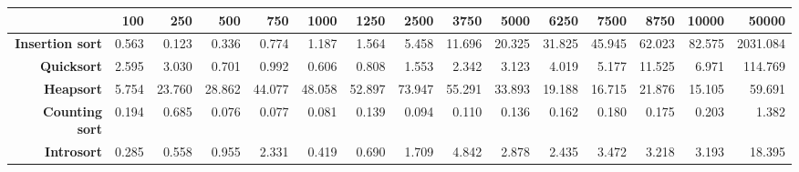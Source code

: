 \begin{tabular}{rrrrrrrrrrrrrrr}
\hline
                         &   \textbf{100} &   \textbf{250} &   \textbf{500} &   \textbf{750} &   \textbf{1000} &   \textbf{1250} &   \textbf{2500} &   \textbf{3750} &   \textbf{5000} &   \textbf{6250} &   \textbf{7500} &   \textbf{8750} &   \textbf{10000} &   \textbf{50000} \\
\hline
 \textbf{Insertion sort} &          0.563 &          0.123 &          0.336 &          0.774 &           1.187 &           1.564 &           5.458 &          11.696 &          20.325 &          31.825 &          45.945 &          62.023 &           82.575 &         2031.084 \\
      \textbf{Quicksort} &          2.595 &          3.030 &          0.701 &          0.992 &           0.606 &           0.808 &           1.553 &           2.342 &           3.123 &           4.019 &           5.177 &          11.525 &            6.971 &          114.769 \\
       \textbf{Heapsort} &          5.754 &         23.760 &         28.862 &         44.077 &          48.058 &          52.897 &          73.947 &          55.291 &          33.893 &          19.188 &          16.715 &          21.876 &           15.105 &           59.691 \\
  \textbf{Counting sort} &          0.194 &          0.685 &          0.076 &          0.077 &           0.081 &           0.139 &           0.094 &           0.110 &           0.136 &           0.162 &           0.180 &           0.175 &            0.203 &            1.382 \\
      \textbf{Introsort} &          0.285 &          0.558 &          0.955 &          2.331 &           0.419 &           0.690 &           1.709 &           4.842 &           2.878 &           2.435 &           3.472 &           3.218 &            3.193 &           18.395 \\
\hline
\end{tabular}